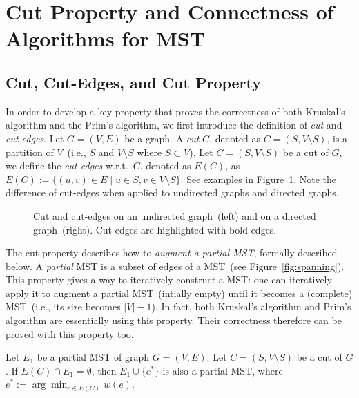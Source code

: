 \setcounter{definition}{0} \setcounter{property}{0} \setcounter{claim}{0} \setcounter{fact}{0} \setcounter{corollary}{0} \setcounter{figure}{0}
\section{Cut Property and Connectness of Algorithms for MST}

\subsection*{Cut, Cut-Edges, and Cut Property}

In order to develop a key property that proves the correctness of both Kruskal's algorithm
and the Prim's algorithm, we first introduce the definition of \emph{cut} and \emph{cut-edges}.
Let $G = (V, E)$ be a graph. A \emph{cut} $C$, denoted as $C = (S, V\setminus S)$,
is a partition of $V$~(i.e., $S$ and $V\setminus S$ where $S\subset V$).
Let $C = (S, V\setminus S)$ be a cut of $G$, we define the \emph{cut-edges} w.r.t.\ $C$,
denoted as $E(C)$, as $E(C) := \{(u,v)\in E\mid u\in S, v\in V\setminus S\}$.
See examples in Figure~\ref{fig:cut}.  Note the difference of cut-edges
when applied to undirected graphs and directed graphs.

\begin{figure}[h]
\centering{}
\caption{Cut and cut-edges on an undirected graph~(left) and on a directed graph~(right).
Cut-edges are highlighted with bold edges.}
\label{fig:cut}
\end{figure}

The cut-property describes how to \emph{augment a partial MST}, 
formally described below.
A \emph{partial} MST is a subset of edges of a MST~(see Figure~\ref{fig:spanning}).
This property gives a way to iteratively construct a MST: one can iteratively
apply it to augment a partial MST~(intially empty) until it becomes a (complete) 
MST~(i.e., its size becomes $|V| - 1$).
In fact, both Kruskal's algorithm and Prim's algorithm
are essentially using this property.
Their correctness therefore can be proved with this property too.

\begin{claim}
Let $E_1$ be a partial MST of graph $G = (V, E)$. %
Let $C = (S,V\setminus S)$ be a cut of $G$.
If $E(C) \cap E_1 = \emptyset$, %
then $E_1\cup \{e^*\}$ is also a partial MST, where $e^* := \arg\min_{e\in E(C)} w(e)$.
\end{claim}

